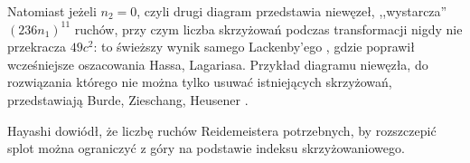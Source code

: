 Natomiast jeżeli $n_2 = 0$, czyli drugi diagram przedstawia niewęzeł, ,,wystarcza'' $(236n_1)^{11}$ ruchów, przy czym liczba skrzyżowań podczas transformacji nigdy nie przekracza $49c^2$: to świeższy wynik samego Lackenby'ego \cite{lackenby2015}, gdzie poprawił wcześniejsze oszacowania Hassa, Lagariasa.
Przykład diagramu niewęzła, do rozwiązania którego nie można tylko usuwać istniejących skrzyżowań, przedstawiają Burde, Zieschang, Heusener \cite[s. 12]{burde2014}.

Hayashi \cite{hayashi2005} dowiódł, że liczbę ruchów Reidemeistera potrzebnych, by rozszczepić splot można ograniczyć z góry na podstawie indeksu skrzyżowaniowego.
%


